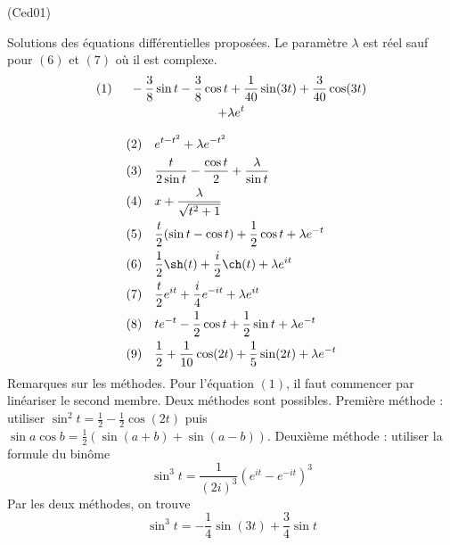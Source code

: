 \begin{tiny}(Ced01)\end{tiny} Solutions des équations différentielles proposées. Le paramètre $\lambda$ est réel sauf pour $(6)$ et $(7)$ où il est complexe.
\begin{multline*}
 (1)\hspace{0.5cm} -\frac{3}{8}\sin t -\frac{3}{8}\cos t + \frac{1}{40}\sin (3t)+\frac{3}{40}\cos(3t)\\ + \lambda e^{t}
\end{multline*}

\begin{align*}
&(2)&  &e^{t-t^2} + \lambda e^{-t^2}\\
&(3)&  &\frac{t}{2\sin t} - \frac{\cos t}{2} + \frac{\lambda}{\sin t}\\
&(4)& &x+\frac{\lambda}{\sqrt{t^2+1}} \\
&(5)& &\frac{t}{2}(\sin t - \cos t)+\frac{1}{2}\cos t + \lambda e^{-t}\\
&(6)& &\frac{1}{2}\sh(t)+\frac{i}{2}\ch(t) + \lambda e^{it} \\
&(7)& &\frac{t}{2}e^{it}+\frac{i}{4}e^{-it}+ \lambda e^{it} \\
&(8)& &te^{-t} -\frac{1}{2}\cos t + \frac{1}{2}\sin t + \lambda e^{-t}\\
&(9)& &\frac{1}{2} + \frac{1}{10}\cos (2t) + \frac{1}{5}\sin(2t) + \lambda e^{-t}
\end{align*}
Remarques sur les méthodes.\newline
Pour l'équation $(1)$, il faut commencer par linéariser le second membre. Deux méthodes sont possibles.\newline
 Première méthode : utiliser $\sin^2 t = \frac{1}{2}-\frac{1}{2}\cos(2t)$ puis $\sin a \cos b = \frac{1}{2}\left(\sin(a+b)+\sin(a-b) \right)$.\newline
Deuxième méthode : utiliser la formule du binôme
\begin{displaymath}
 \sin ^3 t = \frac{1}{(2i)^3}\left(e^{it}-e^{-it} \right)^3 
\end{displaymath}
Par les deux méthodes, on trouve
\begin{displaymath}
 \sin ^3 t = -\frac{1}{4}\sin(3t) + \frac{3}{4}\sin t
\end{displaymath}
  


